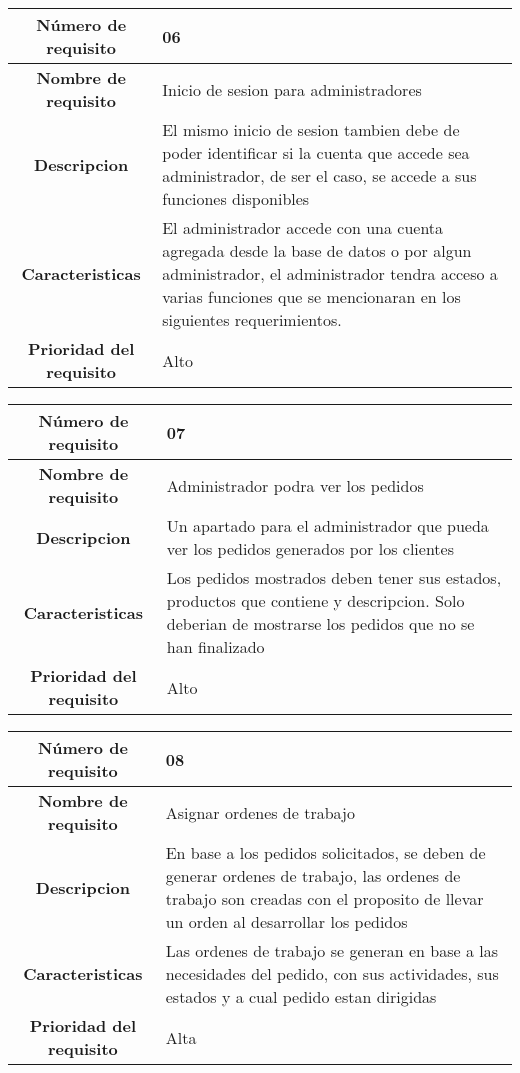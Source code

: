 \documentclass[12pt,a4paper, twosite]{article}
\begin{document}
\begin{center}
    \begin{tabular}{|c|p{6cm}|}
        \hline
        \textbf{Número de requisito} & 06 \\ 
        \hline
        \textbf{Nombre de requisito} & Inicio de sesion para administradores \\
        \hline
        \textbf{Descripcion} & El mismo inicio de sesion tambien debe de poder identificar si la cuenta que accede sea administrador, de ser el caso, se accede a sus funciones disponibles\\
        \hline
        \textbf{Caracteristicas} & El administrador accede con una cuenta agregada desde la base de datos o por algun administrador, el administrador tendra acceso a varias funciones que se mencionaran en los siguientes requerimientos. \\
        \hline
        \textbf{Prioridad del requisito} &Alto  \\
        \hline
     \end{tabular}
\end{center}

\begin{center}
    \begin{tabular}{|c|p{6cm}|}
        \hline
        \textbf{Número de requisito} & 07 \\ 
        \hline
        \textbf{Nombre de requisito} & Administrador podra ver los pedidos \\
        \hline
        \textbf{Descripcion} & Un apartado para el administrador que pueda ver los pedidos generados por los clientes \\
        \hline
        \textbf{Caracteristicas} & Los pedidos mostrados deben tener sus estados, productos que contiene y descripcion. Solo deberian de mostrarse los pedidos que no se han finalizado  \\
        \hline
        \textbf{Prioridad del requisito} & Alto \\
        \hline
     \end{tabular}
\end{center}

\begin{center}
    \begin{tabular}{|c|p{6cm}|}
        \hline
        \textbf{Número de requisito} & 08 \\ 
        \hline
        \textbf{Nombre de requisito} & Asignar ordenes de trabajo \\
        \hline
        \textbf{Descripcion} & En base a los pedidos solicitados, se deben de generar ordenes de trabajo, las ordenes de trabajo son creadas con el proposito de llevar un orden al desarrollar los pedidos \\
        \hline
        \textbf{Caracteristicas} & Las ordenes de trabajo se generan en base a las necesidades del pedido, con sus actividades, sus estados y a cual pedido estan dirigidas\\
        \hline
        \textbf{Prioridad del requisito} &  Alta\\
        \hline
     \end{tabular}
\end{center}
\end{document}

